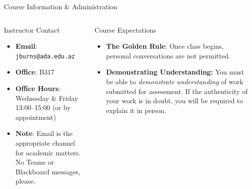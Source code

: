 \documentclass[aspectratio=169,11pt,t]{beamer}
\newcommand{\key}[1]{\textbf{#1}}
\newcommand{\code}[1]{\texttt{#1}}
\begin{document}
\begin{frame}{Course Information \& Administration}

\begin{columns}[T,onlytextwidth]

\begin{block}{Instructor Contact}
\begin{itemize}
  \item \key{Email}:
        \code{jburns@ada.edu.az}
  \item \key{Office}:
        B317
  \item \key{Office Hours}:
        Wednesday \& Friday 13:00--15:00
        (or by appointment)
  \item \key{Note}:
        Email is the appropriate 
        channel for academic matters. No
        Teams or Blackboard messages, please.
\end{itemize}
\end{block}


\begin{block}{Course Expectations}

\begin{itemize}
  \item \key{The Golden Rule}:
  Once class begins, personal 
  conversations are not permitted.
  \item \key{Demonstrating Understanding:} You must 
  be able to \emph{demonstrate understanding} of 
  work submitted for assessment. If the 
  authenticity of your work is in doubt, you 
  will be required to explain it in person.
\end{itemize}

\end{block}

\end{columns}

\end{frame}



\end{document}
